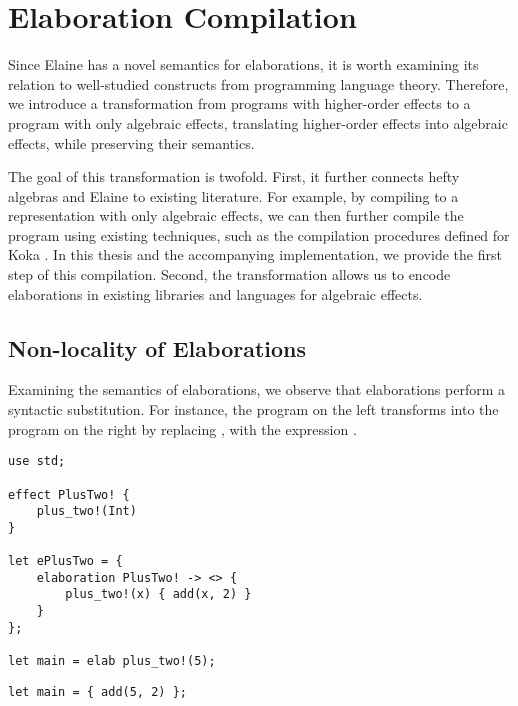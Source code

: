\chapter{Elaboration Compilation}\label{chap:elabcomp}

Since Elaine has a novel semantics for elaborations, it is worth examining its relation to well-studied constructs from programming language theory. Therefore, we introduce a transformation from programs with higher-order effects to a program with only algebraic effects, translating higher-order effects into algebraic effects, while preserving their semantics.

The goal of this transformation is twofold. First, it further connects hefty algebras and Elaine to existing literature. For example, by compiling to a representation with only algebraic effects, we can then further compile the program using existing techniques, such as the compilation procedures defined for Koka \autocite{leijen_type_2017}. In this thesis and the accompanying implementation, we provide the first step of this compilation. Second, the transformation allows us to encode elaborations in existing libraries and languages for algebraic effects.

\section{Non-locality of Elaborations}


Examining the semantics of elaborations, we observe that elaborations perform a syntactic substitution. For instance, the program on the left transforms into the program on the right by replacing , with the expression .

\begin{minipage}[b]{0.5\textwidth}
\begin{lstlisting}[language=elaine,style=fancy]
use std;

effect PlusTwo! {
    plus_two!(Int)
}

let ePlusTwo = {
    elaboration PlusTwo! -> <> {
        plus_two!(x) { add(x, 2) }
    }
};

let main = elab plus_two!(5);
\end{lstlisting}
\end{minipage}
\begin{minipage}[b]{0.5\textwidth}
\begin{lstlisting}[language=elaine,style=fancy]
let main = { add(5, 2) };
\end{lstlisting}
\end{minipage}

